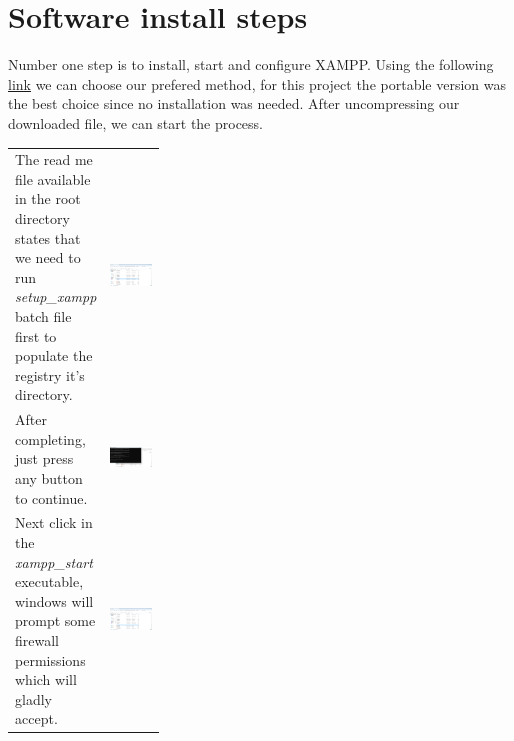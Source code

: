 \documentclass[11pt,a4paper]{report}
\begin{document}
    \section{Software install steps}
        Number one step is to install, start and configure XAMPP. Using the following \href{https://www.apachefriends.org/download.html}{link} we can choose our prefered method, for this project the portable version was the best choice since no installation was needed.
        After uncompressing our downloaded file, we can start the process.
        \begin{flushleft}
        \begin{tabular}{ p{0.3\linewidth} r }
The read me file available in the root directory states that we need to run \textit{setup\_xampp} batch file first to populate the registry it's directory. & \includegraphics[scale=0.3]{install_xampp08} \\ %
After completing, just press any button to continue. & \includegraphics[scale=0.3]{install_xampp09} \\
Next click in the \textit{xampp\_start} executable, windows will prompt some firewall permissions which will gladly accept. & \includegraphics[scale=0.3]{install_xampp10} \\

\end{tabular}
\end{flushleft}
\end{document}

